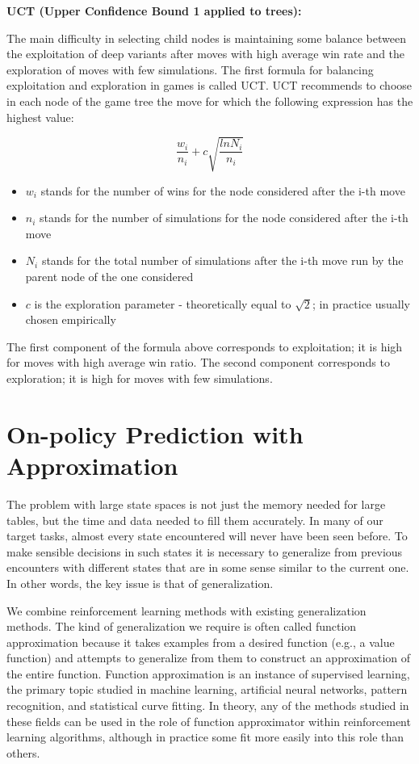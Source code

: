 \documentclass{article}
\begin{document}
\textbf{UCT (Upper Confidence Bound 1 applied to trees):}

The main difficulty in selecting child nodes is maintaining some balance between the exploitation of deep variants after moves with high average win rate and the exploration of moves with few simulations. The first formula for balancing exploitation and exploration in games is called UCT. UCT recommends to choose in each node of the game tree the move for which the following expression has the highest value:

\[\frac{w_{i}}{n_{i}} + c \sqrt{\frac{ln N_{i}}{n_i}}\]

\begin{itemize}
    \item \(w_{i}\) stands for the number of wins for the node considered after the i-th move
    \item \(n_{i}\) stands for the number of simulations for the node considered after the i-th move
    \item \(N_{i}\) stands for the total number of simulations after the i-th move run by the parent node of the one considered
    \item \(c\) is the exploration parameter - theoretically equal to \(\sqrt{2}\); in practice usually chosen empirically
\end{itemize}

The first component of the formula above corresponds to exploitation; it is high for moves with high average win ratio. The second component corresponds to exploration; it is high for moves with few simulations.

\section{On-policy Prediction with Approximation}

The problem with large state spaces is not just the memory needed for large tables, but the time and data needed to fill them accurately. 
In many of our target tasks, almost every state encountered will never have been seen before. To make sensible decisions in such states 
it is necessary to generalize from previous encounters with different states that are in some sense similar to the current one. 
In other words, the key issue is that of generalization.

We combine reinforcement learning methods with existing generalization methods. The kind of generalization we require is often called function approximation 
because it takes examples from a desired function (e.g., a value function) and attempts to generalize from them to construct an approximation of the entire function. 
Function approximation is an instance of supervised learning, the primary topic studied in machine learning, artificial neural networks, pattern recognition, 
and statistical curve fitting. In theory, any of the methods studied in these fields can be used in the role of function approximator within reinforcement learning algorithms, 
although in practice some fit more easily into this role than others.
\end{document}
